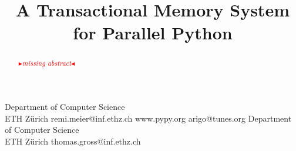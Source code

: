 \documentclass{sigplanconf}
\newcommand{\mynote}[2]{%
  \textcolor{red}{%
    \fbox{\bfseries\sffamily\scriptsize#1}%
    {\small$\blacktriangleright$\textsf{\emph{#2}}$\blacktriangleleft$}%
  }%
}
\newcommand\remi[1]{\mynote{Remi}{#1}}
\newcommand{\comment}[1]{}
\begin{document}
\setlength{\pdfpageheight}{\paperheight}
\setlength{\pdfpagewidth}{\paperwidth}






\title{A Transactional Memory System for Parallel Python}

\comment{
A Platform for Parallelism in Dynamic languages
Parallelism for Python
A TM Implementation for Python
Transactional Memory as a foundation for parallel Python
Transactional Memory as a foundation for parallelism in Python
Parallel Python based on VM-assisted TM
Parallel Python based on VM-assisted Transactional Memory
A Platform for parallel Python
A TM Platform for parallel Python
A Transactional Memory Platform for parallel Python
A Transactional Memory system for parallel Python

Virtual Memory Assisted Transactional Memory for Dynamic Languages}

           {Department of Computer Science\\ ETH Zürich}
           {remi.meier@inf.ethz.ch}
           {www.pypy.org}
           {arigo@tunes.org}
           {Department of Computer Science\\ ETH Zürich}
           {thomas.gross@inf.ethz.ch}

\maketitle

\begin{abstract}
\remi{missing abstract}
\end{abstract}
\end{document}
